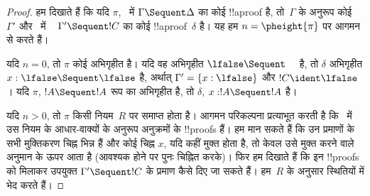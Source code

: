 \documentclass[../../../include/open-logic-section]{subfiles}
\begin{document}
\begin{proof}
  हम दिखाते हैं कि यदि $\pi$,~ में $\Gamma \Sequent \Delta$ का
  कोई !!a{proof} है, तो~$\Gamma$ के अनुरूप कोई~$\Gamma'$ और~ में
  ~ $\Gamma' \Sequent !C$ का कोई !!a{proof}~$\delta$ है। यह हम $n =
  \pheight{\pi}$ पर आगमन से करते हैं।

  यदि $n = 0$, तो $\pi$ कोई अभिगृहीत है। यदि वह अभिगृहीत $\lfalse \Sequent
  \quad$ है, तो $\delta$ अभिगृहीत $x:\lfalse \Sequent \lfalse$ है, अर्थात्
  $\Gamma' = \{x:\lfalse\}$ और $!C \ident \lfalse$। यदि $\pi$, $!A \Sequent
  !A$ रूप का अभिगृहीत है, तो $\delta$, $x: !A \Sequent !A$ है।
  
  यदि $n>0$, तो $\pi$ किसी नियम~$R$ पर समाप्त होता है। आगमन परिकल्पना
  प्रत्याभूत करती है कि~ में उस नियम के आधार-वाक्यों के अनुरूप
  अनुक्रमों के !!{proof}s हैं। हम मान सकते हैं कि उन प्रमाणों के सभी
  मुक्तिकरण चिह्न भिन्न हैं और कोई चिह्न $x$, यदि कहीं मुक्त होता है, तो केवल
  उसे मुक्त करने वाले अनुमान के ऊपर आता है (आवश्यक होने पर पुनः चिह्नित करके)।
  फिर हम दिखाते हैं कि इन !!{proof}s को मिलाकर उपयुक्त $\Gamma' \Sequent !C$
  के प्रमाण कैसे दिए जा सकते हैं। हम~$R$ के अनुसार स्थितियों में भेद करते हैं।


\end{proof}
\end{document}
